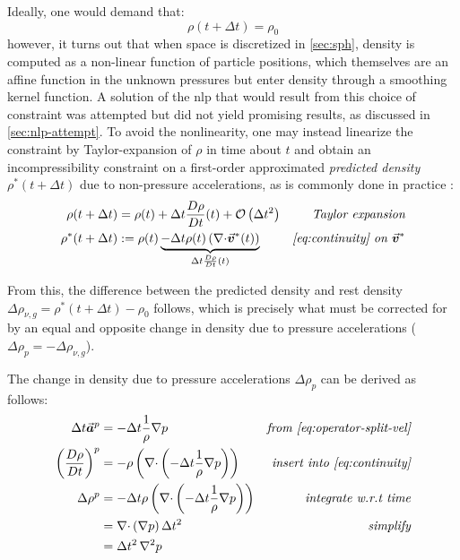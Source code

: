 \documentclass[conference]{IEEEtran}
\newcommand*\Laplace{\mathop{}\!\mathbin\nabla^2}
\newcommand\vek[1]{\vec{\bm{#1}}}
\newcommand\br[1]{\left(#1\right)}
\newcommand\divergence{{\nabla\cdot}}
\begin{document}
Ideally, one would demand that:
\begin{equation}
  \rho(t+\Delta t) = \rho_0
\end{equation}
however, it turns out that when space is discretized in \autoref{sec:sph}, density is computed as a non-linear function of particle positions, which themselves are an affine function in the unknown pressures but enter density through a smoothing kernel function. A solution of the \acs{nlp} that would result from this choice of constraint was attempted but did not yield promising results, as discussed in \autoref{sec:nlp-attempt}. To avoid the nonlinearity, one may instead linearize the constraint by Taylor-expansion of $\rho$ in time about $t$ and obtain an incompressibility constraint on a first-order approximated \textit{predicted density} $\rho^*(t+\Delta t)$ due to non-pressure accelerations, as is commonly done in practice \cite{survey2022}:
\begin{equation}\label{eq:rho-change-non-pr}
  \begin{aligned}
    \rho(t+\Delta t) &= \rho(t) + \Delta t\frac{D\rho}{Dt}(t)+ \mathcal{O}\br{\Delta t^2}&\textit{Taylor expansion}\\
    \rho^*(t+\Delta t) &:=  \rho(t) \underbrace{- \Delta t \rho(t)\br{\divergence \vek{v}^*(t)}}_{\Delta t\frac{D\rho}{Dt}(t)}&\textit{\autoref{eq:continuity} on $\vek{v}^*$}
  \end{aligned}
\end{equation}

From this, the difference between the predicted density and rest density $\Delta \rho_{\nu,g} = \rho^*(t+\Delta t) - \rho_0$ follows, which is precisely what must be corrected for by an equal and opposite change in density due to pressure accelerations ($\Delta \rho_p = -\Delta \rho_{\nu,g}$).

The change in density due to pressure accelerations $\Delta \rho_p$ can be derived as follows:
\begin{equation}\label{eq:rho-change-pr}
  \begin{aligned}
    \Delta t \vek{a}^p &= - \Delta t \frac{1}{\rho}\nabla p & \textit{from \autoref{eq:operator-split-vel}}\\
    \br{\frac{D\rho}{Dt}}^p &= -\rho\br{\divergence \br{- \Delta t \frac{1}{\rho}\nabla p}} & \textit{insert into \autoref{eq:continuity}}\\
    \Delta \rho^p &= -\Delta t\rho\br{\divergence \br{- \Delta t \frac{1}{\rho}\nabla p}} & \textit{integrate w.r.t time}\\
    &= \divergence \br{\nabla p} \Delta t^2 & \textit{simplify}\\
    &= \Delta t^2 \Laplace p&
  \end{aligned}
\end{equation}
\end{document}
